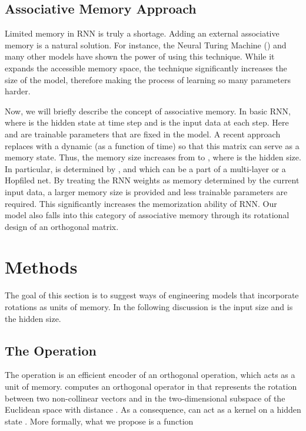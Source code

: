 \documentclass{article} \usepackage{iclr2018_conference,times}
\begin{document}
\subsection{Associative Memory Approach}
Limited memory in RNN is truly a shortage. Adding an external associative memory is a natural solution. For instance, the Neural Turing Machine (\cite{graves2014neural}) and many other models have shown the power of using this technique. While it expands the accessible memory space, the technique significantly increases the size of the model, therefore making the process of learning so many parameters harder. 







Now, we will briefly describe the concept of associative memory. In basic RNN,  where  is the hidden state at time step  and  is the input data at each step. Here  and  are trainable parameters that are fixed in the model. A recent approach replaces  with a dynamic  (as a function of time) so that this matrix can serve as a memory state. Thus, the memory size increases from  to , where  is the hidden size. In particular,  is determined by ,  and  which can be a part of a multi-layer or a Hopfiled net. By treating the RNN weights as memory determined by the current input data, a larger memory size is provided and less trainable parameters are required. This significantly increases the memorization ability of RNN. Our model also falls into this category of associative memory through its rotational design of an orthogonal  matrix. 

\section{Methods}
The goal of this section is to suggest ways of engineering models that incorporate rotations as units of memory. In the following discussion  is the input size and  is the hidden size.
\subsection{The Operation }

The operation  is an efficient encoder of an orthogonal operation, which acts as a unit of memory.   computes an orthogonal operator  in  that represents the rotation between two non-collinear vectors  and  in the two-dimensional subspace  of the Euclidean space  with distance . As a consequence,  can act as a kernel on a hidden state . More formally, what we propose is a function 
 
\end{document}
